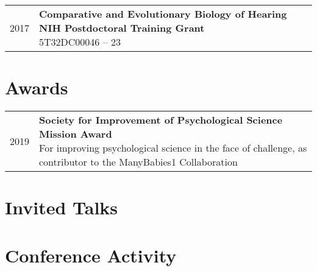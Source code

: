 \documentclass[10pt,a4paper,]{article}
\makeatletter
\newcounter{papers}
\def\briefitem#1#2#3{
#2 & \parbox[t]{0.85\textwidth}{%
      \textbf{#1}\\[-0.1cm]{\footnotesize #3}}\\[0.4cm]}
\def\briefsection#1{\begin{longtable}{@{\extracolsep{\fill}}ll}#1\end{longtable}}
\makeatother
\begin{document}
\briefsection{\briefitem{Comparative and Evolutionary Biology of Hearing NIH Postdoctoral Training Grant}{2017}{5T32DC00046 – 23}\briefitem{Psi Chi Association of Psychological Science Summer Research Grant }{2009}{\$5,000}}

\hypertarget{awards}{%
\section{Awards}\label{awards}}

\briefsection{\briefitem{Society for Improvement of Psychological Science Mission Award}{2019}{For improving psychological science in the face of challenge, as contributor to the ManyBabies1 Collaboration}\briefitem{Berkeley Initiative for Transparency in the Social Sciences (BITSS) Meta-Analysis Challenge Winner}{2018}{Shared with co-author Christina Bergmann, \$1,000}\briefitem{Summer School Travel Grant: GDR Neurosciences Cognitives du Développement bourses de mobilité à des doctorants}{2014}{For the Potsdam Summer School, “Infant Studies on Language Development in Europe (ISOLDE)”}\briefitem{Universitätsbund Göttingen Travel Grant}{2013}{For the International Workshop on Bilingualism and Cognitive Control in Krakow, Poland}\briefitem{Paula Menyuk Travel Award}{2011}{For BUCLD 2011, \$300}\briefitem{Phi Eta Sigma National Honor Society Graduate Scholarship}{2010}{\$7,000}\briefitem{2nd place Margaret Bernauer Psychology Research Award}{2009}{Awarded for Poster Presentation at the Wisconsin Psychological Association Conference, \$200}}

\hypertarget{invited-talks}{%
\section{Invited Talks}\label{invited-talks}}

\newrefcontext[sorting=none]\setcounter{papers}{0}\pagebreak[3]
\printbibliography[category=bib-Presentations.bib-1610300,heading=none]\setcounter{papers}{0}

\nocite{iVH2019b,
iVH2019a,
iVH2018,
iVH2016a,
iVH2016b,
iVH2014,
iVH2012a,
iVH2012b,
iVH2012c}

\hypertarget{conference-activity}{%
\section{Conference Activity}\label{conference-activity}}
\end{document}
